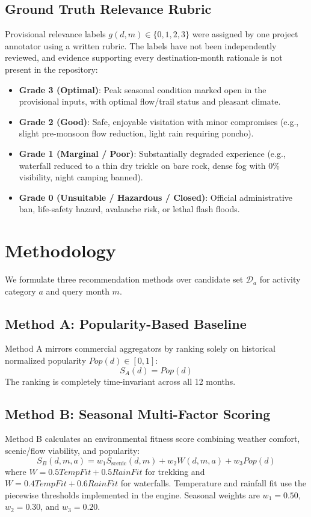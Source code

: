 \documentclass[conference]{IEEEtran}
\begin{document}
\subsection{Ground Truth Relevance Rubric}
Provisional relevance labels $g(d, m) \in \{0, 1, 2, 3\}$ were assigned by one project annotator using a written rubric. The labels have not been independently reviewed, and evidence supporting every destination-month rationale is not present in the repository:
\begin{itemize}
    \item \textbf{Grade 3 (Optimal)}: Peak seasonal condition marked open in the provisional inputs, with optimal flow/trail status and pleasant climate.
    \item \textbf{Grade 2 (Good)}: Safe, enjoyable visitation with minor compromises (e.g., slight pre-monsoon flow reduction, light rain requiring poncho).
    \item \textbf{Grade 1 (Marginal / Poor)}: Substantially degraded experience (e.g., waterfall reduced to a thin dry trickle on bare rock, dense fog with 0\% visibility, night camping banned).
    \item \textbf{Grade 0 (Unsuitable / Hazardous / Closed)}: Official administrative ban, life-safety hazard, avalanche risk, or lethal flash floods.
\end{itemize}

\section{Methodology}
We formulate three recommendation methods over candidate set $\mathcal{D}_a$ for activity category $a$ and query month $m$.

\subsection{Method A: Popularity-Based Baseline}
Method A mirrors commercial aggregators by ranking solely on historical normalized popularity $Pop(d) \in [0, 1]$:
\begin{equation}
S_A(d) = Pop(d)
\end{equation}
The ranking is completely time-invariant across all 12 months.

\subsection{Method B: Seasonal Multi-Factor Scoring}
Method B calculates an environmental fitness score combining weather comfort, scenic/flow viability, and popularity:
\begin{equation}
S_B(d, m, a) = w_1 S_{\text{scenic}}(d, m) + w_2 W(d, m, a) + w_3 Pop(d)
\end{equation}
where $W=0.5 TempFit+0.5 RainFit$ for trekking and $W=0.4 TempFit+0.6 RainFit$ for waterfalls. Temperature and rainfall fit use the piecewise thresholds implemented in the engine. Seasonal weights are $w_1=0.50$, $w_2=0.30$, and $w_3=0.20$.
\end{document}
